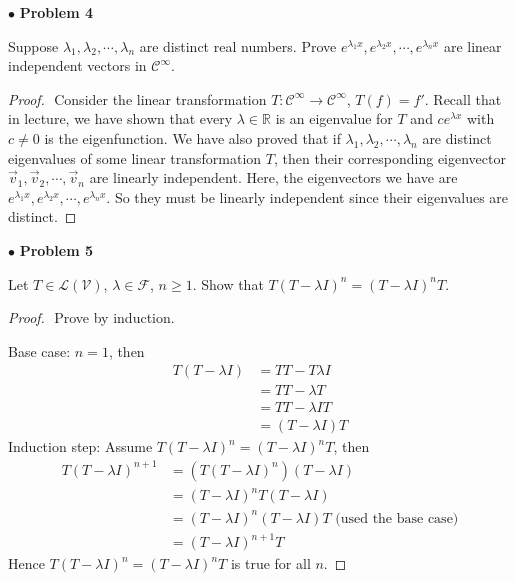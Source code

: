 \documentclass{article}
\begin{document}
\newpage
$ \bullet$ \textbf{Problem 4}
\medskip

\begin{itshape}
Suppose $\lambda_1,\lambda_2, \cdots , \lambda_n$ are distinct real numbers. Prove $e^{\lambda_{1}x},e^{\lambda_{2}x},\cdots , e^{\lambda_{n}x}$ are linear independent vectors in $\mathcal{C}^\infty$.
\end{itshape}
\medskip

\begin{proof}
$ $\newline
Consider the linear transformation $T: \mathcal{C}^\infty \to \mathcal{C}^\infty$, $T(f) = f'$. Recall that in lecture, we have shown that every $\lambda \in \mathbb{R}$ is an eigenvalue for $T$ and $c e^{\lambda x}$ with $c \ne 0$ is the eigenfunction. We have also proved that if $\lambda_1, \lambda_2, \cdots, \lambda_n$ are distinct eigenvalues of some linear transformation $T$, then their corresponding eigenvector $\vec{v}_1, \vec{v}_2, \cdots, \vec{v}_n$ are linearly independent. Here, the eigenvectors we have are $e^{\lambda_{1}x},e^{\lambda_{2}x},\cdots , e^{\lambda_{n}x}$. So they must be linearly independent since their eigenvalues are distinct.
\end{proof}

\newpage
$ \bullet$ \textbf{Problem 5}
\medskip

\begin{itshape}
Let $T \in \mathcal{L}(\mathcal{V})$, $ \lambda \in \mathcal{F}$, $n \ge1$. Show that $T(T-\lambda I)^n = (T-\lambda I )^n T$.
\end{itshape}
\medskip

\begin{proof}
$ $\newline
Prove by induction. 

Base case: $n=1$, then 
\begin{align*}
T(T-\lambda I) &= TT - T\lambda I \\
&= TT- \lambda T \\
&= TT- \lambda I T \\
&= (T-\lambda I)T
\end{align*}
Induction step: Assume $T(T-\lambda I )^n = (T-\lambda I )^n T$, then
\begin{align*}
T(T-\lambda I )^{n+1} &= (T(T-\lambda I )^n )(T-\lambda I ) \\
&= (T-\lambda I )^nT (T-\lambda I ) \\
&= (T-\lambda I )^n (T-\lambda I ) T \text{ (used the base case)} \\
&= (T-\lambda I )^{n+1}T
\end{align*} 
Hence $T(T-\lambda I)^n = (T-\lambda I )^n T$ is true for all $n$.
\end{proof}
\end{document}
